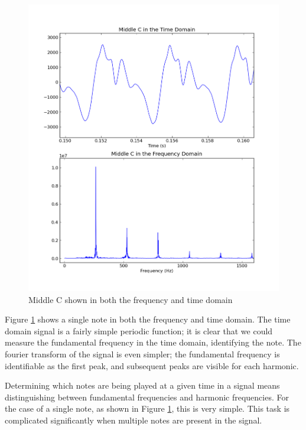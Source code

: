 \documentclass[twocolumn]{article}
\begin{document}
\begin{figure}[htb]
  \centering
  \includegraphics[scale=0.335]{middlec.png}
  \caption{Middle C shown in both the frequency and time domain}
  \label{middlec}
\end{figure}

Figure \ref{middlec} shows a single note in both the frequency and time domain.  The time domain signal is a fairly simple periodic function; it is clear that we could measure the fundamental frequency in the time domain, identifying the note.  The fourier transform of the signal is even simpler; the fundamental frequency is identifiable as the first peak, and subsequent peaks are visible for each harmonic.

Determining which notes are being played at a given time in a signal means distinguishing between fundamental frequencies and harmonic frequencies.  For the case of a single note, as shown in Figure \ref{middlec}, this is very simple.  This task is complicated significantly when multiple notes are present in the signal.
\end{document}
